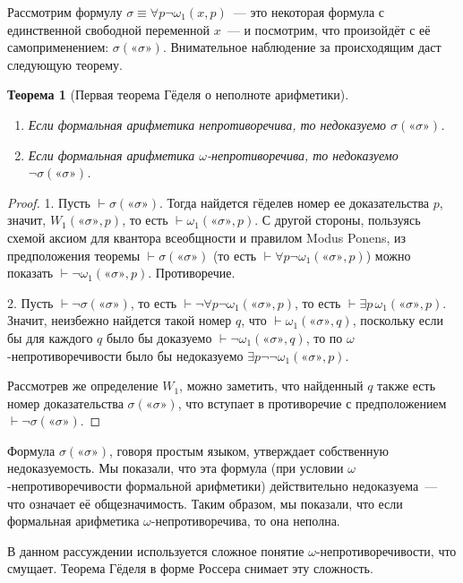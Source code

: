 \documentclass[a4paper,11pt]{article}
\newtheorem{thm}{Теорема}[section]
\theoremstyle{definition}
\newcommand{\proves}{\vdash}
\newcommand{\gn}[1]{\text{«}#1\text{»}}
\begin{document}
Рассмотрим формулу $\sigma \equiv \forall p\neg\omega_1(x, p)$~--- это
некоторая формула с единственной свободной переменной $x$~--- и посмотрим, что
произойдёт с её самоприменением: $\sigma(\gn{\sigma})$. Внимательное
наблюдение за происходящим даст следующую теорему.

\begin{thm}[Первая теорема Гёделя о неполноте арифметики]
\begin{enumerate}
\item Если формальная арифметика непротиворечива, то недоказуемо
  $\sigma(\gn{\sigma})$.
\item Если формальная арифметика $\omega$-непротиворечива, то недоказуемо
  $\neg\sigma(\gn{\sigma})$.
\end{enumerate}
\end{thm}
\begin{proof}
1. Пусть $\proves \sigma(\gn{\sigma})$. Тогда найдется гёделев номер ее
доказательства $p$, значит, $W_1(\gn{\sigma}, p)$, то есть $\proves
\omega_1(\gn{\sigma}, p)$. С другой стороны, пользуясь схемой аксиом для
квантора всеобщности и правилом Modus Ponens, из предположения теоремы $\proves
\sigma(\gn{\sigma})$ (то есть $\proves \forall p\neg\omega_1(\gn{\sigma}, p)$)
можно показать $\proves \neg\omega_1(\gn{\sigma}, p)$. Противоречие.

2. Пусть $\proves \neg\sigma(\gn{\sigma})$, то есть $\proves \neg\forall
p\neg\omega_1(\gn{\sigma}, p)$, то есть $\proves \exists p\,\omega_1(\gn{\sigma},
p)$. Значит, неизбежно найдется такой номер $q$, что $\proves
\omega_1(\gn{\sigma}, q)$, поскольку если бы для каждого $q$ было бы доказуемо
$\proves \neg\omega_1(\gn{\sigma}, q)$, то по $\omega$-непротиворечивости было
бы недоказуемо $\exists p\neg\neg\omega_1(\gn{\sigma}, p)$.

Рассмотрев же определение $W_1$, можно заметить, что найденный $q$ также есть
номер доказательства $\sigma(\gn{\sigma})$, что вступает в противоречие с
предположением $\proves \neg\sigma(\gn{\sigma})$.
\end{proof}

Формула $\sigma(\gn{\sigma})$, говоря простым языком, утверждает собственную
недоказуемость. Мы показали, что эта формула (при условии
$\omega$-непротиворечивости формальной арифметики) действительно недоказуема~---
что означает её общезначимость. Таким образом, мы показали, что если формальная
арифметика $\omega$-непротиворечива, то она неполна.

В данном рассуждении используется сложное понятие $\omega$-непротиворечивости,
что смущает. Теорема Гёделя в форме Россера снимает эту сложность.
\end{document}
